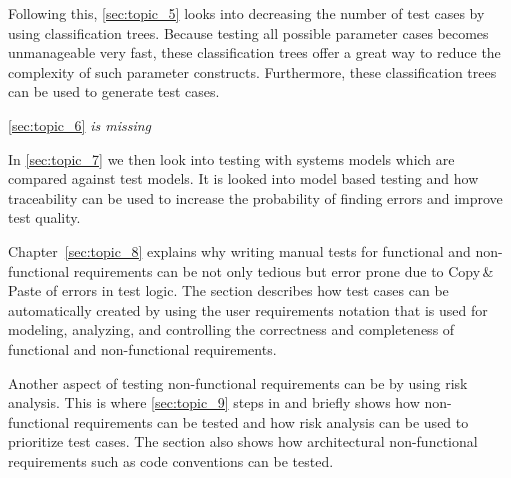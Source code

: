 

Following this,
\autoref{sec:topic_5} %
looks into decreasing the number of test cases by using classification trees.
Because testing all possible parameter cases becomes unmanageable very fast, these classification trees offer a great way to reduce the complexity of such parameter constructs.
Furthermore, these classification trees can be used to generate test cases.


\autoref{sec:topic_6} %
\textit{is missing}

In \autoref{sec:topic_7} %
we then look into testing with systems models which are compared against test models.
It is looked into model based testing and how traceability can be used to increase the probability of finding errors and improve test quality.

Chapter~\ref{sec:topic_8} %
explains why writing manual tests for functional and non-functional requirements can be  not only tedious but error prone due to Copy\,\&\,Paste of errors in test logic.
The section describes how test cases can be automatically created by using the user requirements notation that is used for modeling, analyzing, and controlling the correctness and completeness of functional and non-functional requirements.

Another aspect of testing non-functional requirements can be by using risk analysis.
This is where \autoref{sec:topic_9} %
steps in and briefly shows how non-functional requirements can be tested and how risk analysis can be used to prioritize test cases.
The section also shows how architectural non-functional requirements such as code conventions can be tested.

